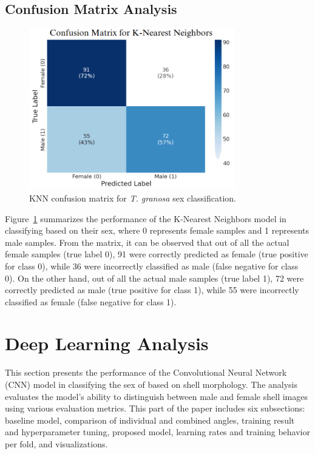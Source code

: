 \subsection{Confusion Matrix Analysis}

\begin{figure}[!htbp]
	\centering
	\includegraphics[width=0.8\textwidth]{figures/confusion_matrix_ml.png}
	\caption{KNN confusion matrix for \textit{T. granosa} sex classification.}
	\label{fig:cm_ml}
\end{figure}

Figure~\ref{fig:cm_ml} summarizes the performance of the K-Nearest Neighbors model in classifying \Tgranosa based on their sex, where 0 represents female samples and 1 represents male samples. From the matrix, it can be observed that out of all the actual female samples (true label 0), 91 were correctly predicted as female (true positive for class 0), while 36 were incorrectly classified as male (false negative for class 0). On the other hand, out of all the actual male samples (true label 1), 72 were correctly predicted as male (true positive for class 1), while 55 were incorrectly classified as female (false negative for class 1).

\section{Deep Learning Analysis}
This section presents the performance of the Convolutional Neural Network (CNN) model in classifying the sex of \Tgranosa based on shell morphology. The analysis evaluates the model's ability to distinguish between male and female shell images using various evaluation metrics. This part of the paper includes six subsections: baseline model, comparison of individual and combined angles, training result and hyperparameter tuning, proposed model, learning rates and training behavior per fold, and visualizations.

